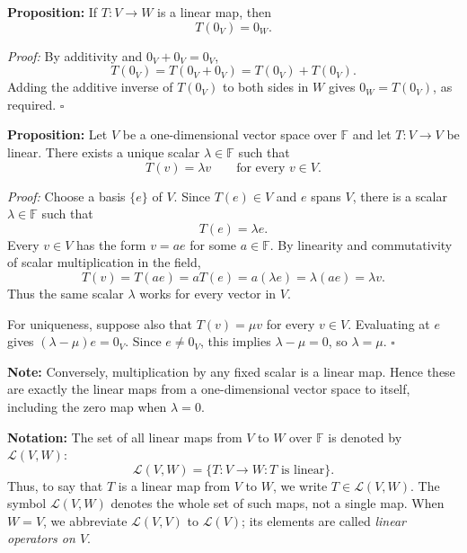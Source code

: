 \documentclass[a4paper,11pt,abstract=true]{scrartcl}
\theoremstyle{dotlessP}
\theoremstyle{dotlessS}
\theoremstyle{remark}
\theoremstyle{definition}
\begin{document}
\begin{problem_box}
\textbf{Proposition:} If
$T:V\longrightarrow W$ is a linear map, then
\[
T(0_V)=0_W.
\]

\end{problem_box}

\begin{claim_box}
\textit{Proof:} By additivity and $0_V+0_V=0_V$,
\[
T(0_V)=T(0_V+0_V)=T(0_V)+T(0_V).
\]
Adding the additive inverse of $T(0_V)$ to both sides in $W$ gives
$0_W=T(0_V)$, as required. \hfill$\square$
\end{claim_box}

\begin{problem_box}
\textbf{Proposition:} Let
$V$ be a one-dimensional vector space over $\mathbb{F}$ and let
$T:V\longrightarrow V$ be linear. There exists a unique scalar
$\lambda\in\mathbb{F}$ such that
\[
T(v)=\lambda v\qquad\text{for every }v\in V.
\]

\end{problem_box}

\begin{claim_box}
\textit{Proof:} Choose a basis $\{e\}$ of $V$. Since $T(e)\in V$ and
$e$ spans $V$, there is a scalar $\lambda\in\mathbb{F}$ such that
\[
T(e)=\lambda e.
\]
Every $v\in V$ has the form $v=ae$ for some $a\in\mathbb{F}$.
By linearity and commutativity of scalar multiplication in the field,
\[
T(v)=T(ae)=aT(e)=a(\lambda e)=\lambda(ae)=\lambda v.
\]
Thus the same scalar $\lambda$ works for every vector in $V$.

For uniqueness, suppose also that $T(v)=\mu v$ for every $v\in V$.
Evaluating at $e$ gives $(\lambda-\mu)e=0_V$. Since $e\neq0_V$,
this implies $\lambda-\mu=0$, so $\lambda=\mu$.
\hfill$\square$
\end{claim_box}

\begin{claim_box}
\textbf{Note:} Conversely, multiplication by any fixed scalar is
a linear map. Hence these are exactly the linear maps from a
one-dimensional vector space to itself, including the zero map when
$\lambda=0$.
\end{claim_box}

\begin{definition_box}
\textbf{Notation:} The set of all linear maps from $V$ to $W$ over
$\mathbb{F}$ is denoted by $\mathcal{L}(V,W)$:
\[
\mathcal{L}(V,W)=\{T:V\longrightarrow W:T\text{ is linear}\}.
\]
Thus, to say that $T$ is a linear map from $V$ to $W$, we write
$T\in\mathcal{L}(V,W)$. The symbol $\mathcal{L}(V,W)$ denotes the whole set
of such maps, not a single map. When $W=V$, we abbreviate
$\mathcal{L}(V,V)$ to $\mathcal{L}(V)$; its elements are called
\emph{linear operators on $V$}.
\end{definition_box}
\end{document}

